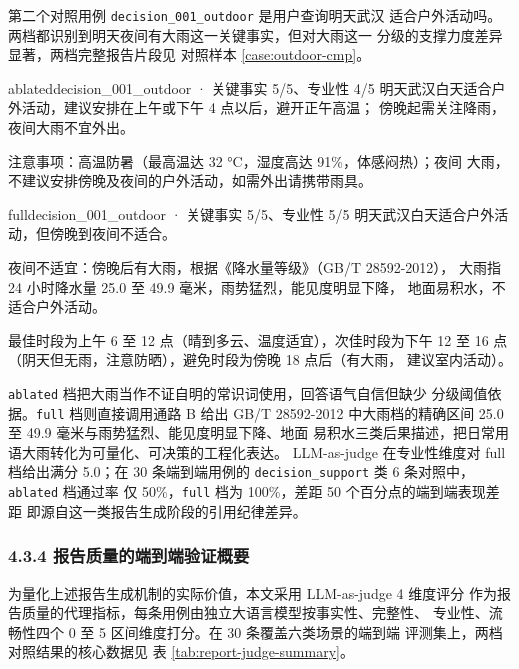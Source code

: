 \documentclass[a4paper]{article}
\theoremstyle{definition}
\theoremstyle{plain}
\theoremstyle{remark}
\newcommand{\reftab}[1]{表 \ref{#1}}
\newcommand{\refcase}[1]{对照样本 \ref{#1}}
\newcommand{\bk}{\discretionary{}{}{}}
\begin{document}
第二个对照用例 \texttt{decision\_\bk{}001\_\bk{}outdoor} 是用户查询明天武汉
适合户外活动吗。两档都识别到明天夜间有大雨这一关键事实，但对大雨这一
分级的支撑力度差异显著，两档完整报告片段见 \refcase{case:outdoor-cmp}。

\begin{casebox}
    \caption{\texttt{decision\_\bk{}001\_\bk{}outdoor} 用例 \texttt{ablated} 档与 \texttt{full} 档报告片段对照}
    \label{case:outdoor-cmp}
    \begin{reportsnippet}{ablated}{decision\_\bk{}001\_\bk{}outdoor · 关键事实 5/5、专业性 4/5}
    明天武汉白天适合户外活动，建议安排在上午或下午 4 点以后，避开正午高温；
    傍晚起需关注降雨，夜间大雨不宜外出。

    注意事项：高温防暑（最高温达 32 °C，湿度高达 91\%，体感闷热）；夜间
    大雨，不建议安排傍晚及夜间的户外活动，如需外出请携带雨具。
    \end{reportsnippet}

    \begin{reportsnippet}{full}{decision\_\bk{}001\_\bk{}outdoor · 关键事实 5/5、专业性 5/5}
    明天武汉白天适合户外活动，但傍晚到夜间不适合。

    夜间不适宜：傍晚后有大雨，根据《降水量等级》（GB/T 28592-2012），
    大雨指 24 小时降水量 25.0 至 49.9 毫米，雨势猛烈，能见度明显下降，
    地面易积水，不适合户外活动。

    最佳时段为上午 6 至 12 点（晴到多云、温度适宜），次佳时段为下午
    12 至 16 点（阴天但无雨，注意防晒），避免时段为傍晚 18 点后（有大雨，
    建议室内活动）。
    \end{reportsnippet}
\end{casebox}

\texttt{ablated} 档把大雨当作不证自明的常识词使用，回答语气自信但缺少
分级阈值依据。\texttt{full} 档则直接调用通路 B 给出 GB/T 28592-2012
中大雨档的精确区间 25.0 至 49.9 毫米与雨势猛烈、能见度明显下降、地面
易积水三类后果描述，把日常用语大雨转化为可量化、可决策的工程化表达。
LLM-as-judge 在专业性维度对 full 档给出满分 5.0；在 30 条端到端用例的
\texttt{decision\_\bk{}support} 类 6 条对照中，\texttt{ablated} 档通过率
仅 50\%，\texttt{full} 档为 100\%，差距 50 个百分点的端到端表现差距
即源自这一类报告生成阶段的引用纪律差异。

\subsubsection*{4.3.4 \quad 报告质量的端到端验证概要}

为量化上述报告生成机制的实际价值，本文采用 LLM-as-judge 4 维度评分
作为报告质量的代理指标，每条用例由独立大语言模型按事实性、完整性、
专业性、流畅性四个 0 至 5 区间维度打分。在 30 条覆盖六类场景的端到端
评测集上，两档对照结果的核心数据见 \reftab{tab:report-judge-summary}。
\end{document}
